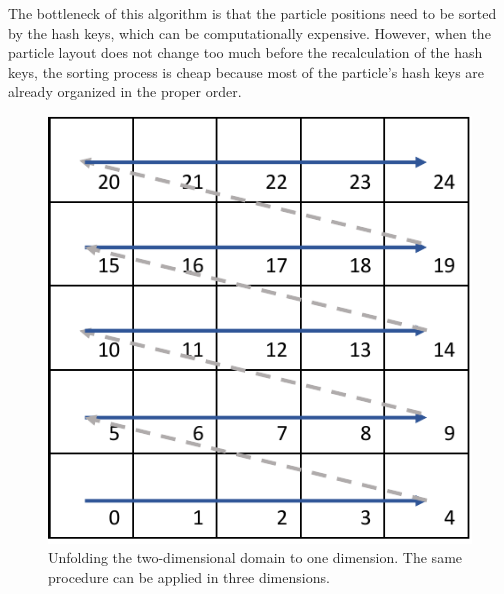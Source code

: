 \documentclass[a4paper,12pt,openany]{book}
\theoremstyle{break}
\begin{document}
The bottleneck of this algorithm is that the particle positions need to be sorted by the hash keys, which can be computationally expensive. However, when the particle layout does not change too much before the recalculation of the hash keys, the sorting process is cheap because most of the particle's hash keys are already organized in the proper order.\\
\begin{figure}[H]
  \includegraphics[scale=0.6]{hash_key.pdf}
  \centering
  \caption{Unfolding the two-dimensional domain to one dimension. The same procedure can be applied in three dimensions.}
  \label{fig:unfolding}
\end{figure}\vspace*{3pt}
\end{document}
